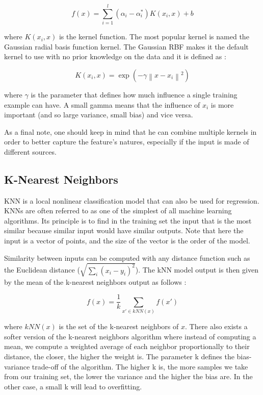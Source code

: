 \documentclass[11pt,a4paper,oneside]{book}
\begin{document}
\begin{equation}
f\left ( x \right ) = \sum_{i=1}^l \left ( \alpha_i - \alpha_i^* \right )K\left ( x_i, x \right ) + b
\end{equation}

where $K\left ( x_i, x \right )$ is the kernel function. The most popular kernel is named the Gaussian radial basis function kernel. The Gaussian RBF makes it the default kernel to use with no prior knowledge on the data and it is defined as : 

\begin{equation}
K\left ( x_i, x \right ) = \exp \left ( -\gamma \left \| x - x_i \right \|^2 \right )
\end{equation}

where $\gamma$\label{gamma} is the parameter that defines how much influence a single training example can have. A small gamma means that the influence of $x_i$ is more important (and so large variance, small bias) and vice versa.

As a final note, one should keep in mind that he can combine multiple kernels in order to better capture the feature's natures, especially if the input is made of different sources.


\subsection{K-Nearest Neighbors}

KNN is a local nonlinear classification model that can also be used for regression. KNNs are often referred to as one of the simplest of all machine learning algorithms. Its principle is to find in the training set the input that is the most similar because similar input would have similar outputs. Note that here the input is a vector of points, and the size of the vector is the order of the model. 

Similarity between inputs can be computed with any distance function such as the Euclidean distance ($\sqrt{\sum_i \left (  x_i - y_i \right )^{2}}$). The kNN model output is then given by the mean of the k-nearest neighbors output as follows :


\begin{equation}
f\left ( x \right ) = \frac{1}{k}\sum_{x' \in kNN(x) } f\left ( x' \right )
\end{equation}

where $kNN(x)$ is the set of the k-nearest neighbors of $x$. There also exists a softer version of the k-nearest neighbors algorithm where instead of computing a mean, we compute a weighted average of each neighbor proportionally to their distance, the closer, the higher the weight is. The parameter k defines the bias-variance trade-off of the algorithm. The higher k is, the more samples we take from our training set, the lower the variance and the higher the bias are. In the other case, a small k will lead to overfitting. \cite{navot}
\end{document}
